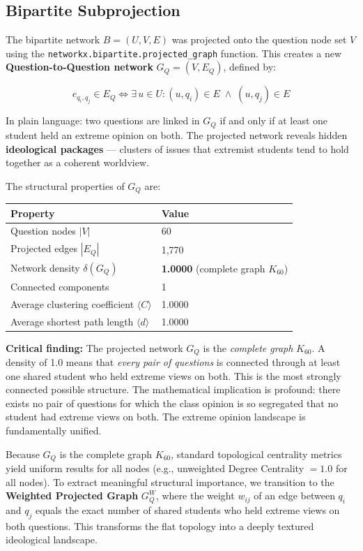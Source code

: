 \documentclass[11pt, a4paper]{article}
\begin{document}
\subsection{Bipartite Subprojection}

The bipartite network $B = (U, V, E)$ was projected onto the question node set $V$ using the \texttt{networkx.bipartite.projected\_graph} function. This creates a new \textbf{Question-to-Question network} $G_Q = (V, E_Q)$, defined by:

$$e_{q_i, q_j} \in E_Q \iff \exists\, u \in U : (u, q_i) \in E \;\land\; (u, q_j) \in E$$

In plain language: two questions are linked in $G_Q$ if and only if at least one student held an extreme opinion on both. The projected network reveals hidden \textbf{ideological packages} --- clusters of issues that extremist students tend to hold together as a coherent worldview.

The structural properties of $G_Q$ are:

\begin{center}
\begin{tabular}{ll}
\toprule
\textbf{Property} & \textbf{Value} \\
\midrule
Question nodes $|V|$ & 60 \\
Projected edges $|E_Q|$ & 1,770 \\
Network density $\delta(G_Q)$ & \textbf{1.0000} (complete graph $K_{60}$) \\
Connected components & 1 \\
Average clustering coefficient $\langle C \rangle$ & 1.0000 \\
Average shortest path length $\langle d \rangle$ & 1.0000 \\
\bottomrule
\end{tabular}
\end{center}

\textbf{Critical finding:} The projected network $G_Q$ is the \textit{complete graph} $K_{60}$. A density of 1.0 means that \textit{every pair of questions} is connected through at least one shared student who held extreme views on both. This is the most strongly connected possible structure. The mathematical implication is profound: there exists no pair of questions for which the class opinion is so segregated that no student had extreme views on both. The extreme opinion landscape is fundamentally unified.

Because $G_Q$ is the complete graph $K_{60}$, standard topological centrality metrics yield uniform results for all nodes (e.g., unweighted Degree Centrality $= 1.0$ for all nodes). To extract meaningful structural importance, we transition to the \textbf{Weighted Projected Graph} $G_Q^W$, where the weight $w_{ij}$ of an edge between $q_i$ and $q_j$ equals the exact number of shared students who held extreme views on both questions. This transforms the flat topology into a deeply textured ideological landscape.
\end{document}

